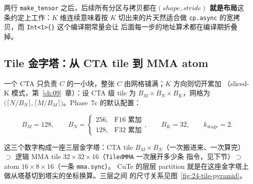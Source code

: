 两行 \texttt{make\_tensor} 之后，后续所有分区与拷贝都在\textbf{$(shape,stride)$
就是布局}这条约定上工作：$K$ 维连续意味着按 $K$ 切出来的片天然适合做
\texttt{cp.async} 的宽拷贝，而 \texttt{Int<1>\{\}} 这个编译期常量会让
后面每一步的地址算术都在编译期折叠掉。

\subsection{Tile 金字塔：从 CTA tile 到 MMA atom}

一个 CTA 只负责 $C$ 的一小块，整张 $C$ 由网格铺满；$K$ 方向则切开累加
（sliced-K 模式，第~\ref{ch:09}~章）：设 CTA 级 tile 为
$B_M\times B_N\times B_K$，网格为
$\bigl(\lceil N/B_N\rceil,\lceil M/B_M\rceil\bigr)$。Phase~7c 的默认配置：

\begin{equation}
  B_M=128,\qquad
  B_N=\begin{cases}256, & \text{F16 累加}\\ 128, & \text{F32 累加}\end{cases},
  \qquad B_K=32,\qquad k_{\mathrm{stage}}=2 .
  \label{eq:24-tile}
\end{equation}

这三个数字构成一座三层金字塔：CTA tile $B_M\times B_N$（一次搬进来、一次算完）
$\supset$ 逻辑 MMA tile $32\times32\times16$（\texttt{TiledMMA} 一次展开多少条
指令，见下节）$\supset$ atom $16\times8\times16$（一条 \texttt{mma.sync}）。
CuTe 的层层 partition 就是在这座金字塔上做从塔基切到塔尖的坐标换算。三层之间
的尺寸关系见图~\ref{fig:24-tile-pyramid}。

